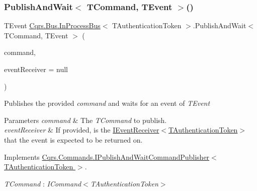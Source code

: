 \subsubsection{\texorpdfstring{Publish\+And\+Wait$<$ T\+Command, T\+Event $>$()}{PublishAndWait< TCommand, TEvent >()}\hspace{0.1cm}{\footnotesize\ttfamily [1/6]}}
{\footnotesize\ttfamily T\+Event \hyperlink{classCqrs_1_1Bus_1_1InProcessBus}{Cqrs.\+Bus.\+In\+Process\+Bus}$<$ T\+Authentication\+Token $>$.Publish\+And\+Wait$<$ T\+Command, T\+Event $>$ (\begin{DoxyParamCaption}\item[{T\+Command}]{command,  }\item[{\hyperlink{interfaceCqrs_1_1Events_1_1IEventReceiver}{I\+Event\+Receiver}$<$ T\+Authentication\+Token $>$}]{event\+Receiver = {\ttfamily null} }\end{DoxyParamCaption})}



Publishes the provided {\itshape command}  and waits for an event of {\itshape T\+Event}  


\begin{DoxyParams}{Parameters}
{\em command} & The {\itshape T\+Command}  to publish.\\
\hline
{\em event\+Receiver} & If provided, is the \hyperlink{interfaceCqrs_1_1Events_1_1IEventReceiver}{I\+Event\+Receiver$<$\+T\+Authentication\+Token$>$} that the event is expected to be returned on.\\
\hline
\end{DoxyParams}


Implements \hyperlink{interfaceCqrs_1_1Commands_1_1IPublishAndWaitCommandPublisher_a19ffb318c830e9f05d4adae985232f30}{Cqrs.\+Commands.\+I\+Publish\+And\+Wait\+Command\+Publisher$<$ T\+Authentication\+Token $>$}.

\begin{Desc}
\item[Type Constraints]\begin{description}
\item[{\em T\+Command} : {\em I\+Command$<$T\+Authentication\+Token$>$}]\end{description}
\end{Desc}
\mbox{\label{classCqrs_1_1Bus_1_1InProcessBus_a977e49340f771248ddf485eeee650e04}} 
